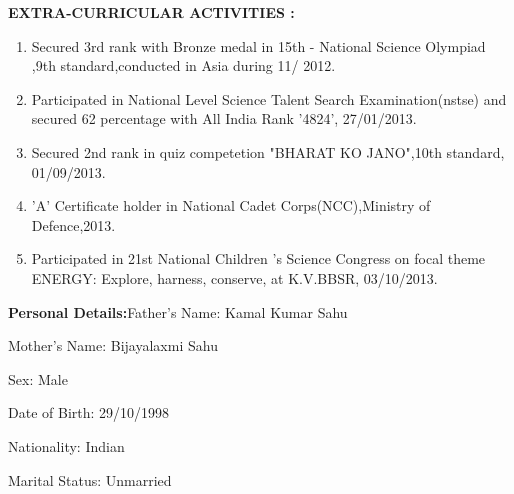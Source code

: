 \documentclass[a4]{article}
\begin{document}
\vspace{3mm}
\textbf{EXTRA-CURRICULAR ACTIVITIES : } 
\begin{enumerate}
	\item Secured 3rd rank with Bronze medal in 15th - National Science Olympiad ,9th standard,conducted in Asia during 11/ 2012.
        \item Participated in National Level Science Talent Search Examination(nstse) and secured 62 percentage with All India Rank '4824', 27/01/2013.
	\item Secured 2nd rank in quiz competetion "BHARAT KO JANO",10th standard, 01/09/2013.
        \item 'A' Certificate holder in National Cadet Corps(NCC),Ministry of Defence,2013.
        \item Participated in 21st National Children 's Science Congress on focal theme ENERGY: Explore, harness, conserve, at K.V.BBSR, 03/10/2013.
        
\end{enumerate}

\vspace{3mm}
\textbf{Personal Details:}\hspace{.4cm}Father's Name: Kamal Kumar Sahu

\hspace{3.4cm}Mother's Name: Bijayalaxmi Sahu

\hspace{3.4cm}Sex: Male

\hspace{3.4cm}Date of Birth: 29/10/1998

\hspace{3.4cm}Nationality: Indian

\hspace{3.4cm}Marital Status: Unmarried
\end{document}
